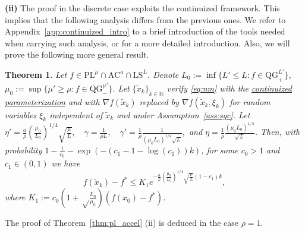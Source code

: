 \documentclass{article}
\def\N{{\mathbb{N}}}
\def\xdisctilde{\{\tilde{x}_k \}_{k\in \N}}
\def\pl{{\text{PL}^\mu}}
\newcommand{\bpar}[1]{\left(#1\right)}
\newcommand{\ls}{\text{LS}^{L}}
\newcommand{\ac}{\text{AC}^{a}}
\newcommand{\qgf}[1]{\text{QG}_{+}^{#1}}
\newcommand{\qginff}[1]{\text{QG}_{-}^{#1}}
\theoremstyle{plain}
\newtheorem{theorem}{Theorem}[section]
\theoremstyle{definition}
\theoremstyle{remark}
\begin{document}
 
\textbf{(ii) \:} The proof in the discrete case exploits the continuized framework. This implies that the following analysis differs from the previous ones. We refer to Appendix~\ref{app:continuized_intro} to a brief introduction of the tools needed when carrying such analysis, or \cite{hermant2025continuized} for a more detailed introduction. Also, we will prove the following more general result.
\begin{theorem}\label{thm:sto_pl_accel}
Let $f\in \pl \cap \ac \cap \ls$.  Denote $L_0 := \inf \{L'\le L:  f \in \qgf{L'} \}$, $\mu_0 := \sup\{\mu' \ge \mu : f \in \qginff{\mu'}\}$.
 Let $\xdisctilde$ verify \eqref{eq:nm} with the \hyperlink{cont_param}{continuized parameterization} and with $\nabla f(\tilde x_k)$ replaced by $\nabla f(\tilde x_k,\xi_k)$ for random variables $\xi_k$ independent of $\tilde x_k$ and under Assumption~\ref{ass:sgc}. Let $\eta' = \frac{a}{\rho}\bpar{\frac{\mu_0}{L_0}}^{1/4}\sqrt{\frac{\mu}{L}},\quad \gamma = \frac{1}{\rho L},\quad \gamma' = \frac{1}{\rho} \frac{1}{( \mu_0 L_0)^{1/4}\sqrt{ L}}, $ and $\eta = \frac{1}{\rho}\frac{(\mu_0 L_0)^{1/4}}{\sqrt{L}}$. Then,  
    with probability  $1-\frac{1}{c_0} - \exp(-(c_1-1-\log(c_1))k)$, for some $c_0 > 1$ and $c_1 \in (0,1)$ we have
$$ f(\tilde x_k)-f^\ast \le K_1e^{-\frac{a}{\rho}\bpar{\frac{\mu_0}{L_0}}^{1/4}\sqrt{\frac{\mu}{L}}(1-c_1)k}, $$
where $K_1 := c_0\bpar{1+\sqrt\frac{L_0}{\mu_0}}(f(x_0)-f^\ast)$.
\end{theorem}
The proof of Theorem~\ref{thm:pl_accel} (ii) is deduced in the case $\rho = 1$.
\end{document}

